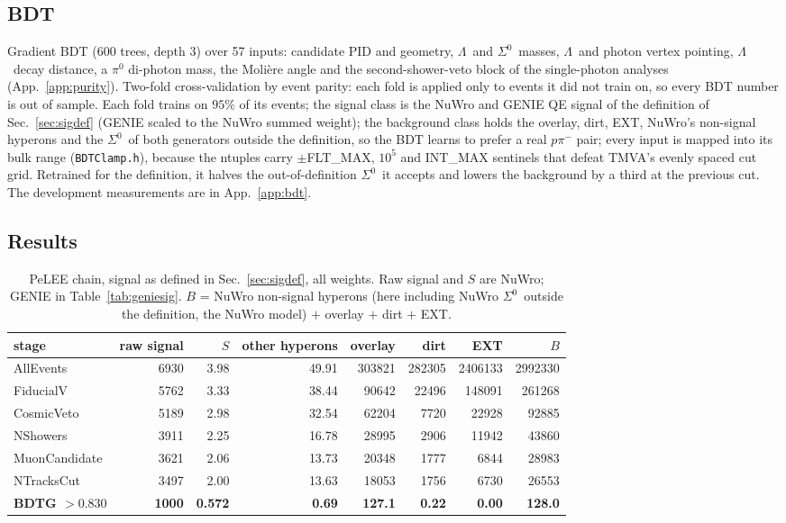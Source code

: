 \documentclass[11pt,a4paper]{article}
\newcommand{\Szero}{\ensuremath{\Sigma^{0}}}
\newcommand{\Lam}{\ensuremath{\Lambda}}
\begin{document}
\subsection{BDT}
\label{sec:bdt}
Gradient BDT (600 trees, depth 3) over 57 inputs: candidate PID and geometry, \Lam\ and
\Szero\ masses, \Lam\ and photon vertex pointing, \Lam\ decay distance, a $\pi^0$
di-photon mass, the Moli\`ere angle and the second-shower-veto block of the single-photon
analyses (App.~\ref{app:purity}). Two-fold cross-validation by event parity: each fold
is applied only to events it did not train on, so every BDT number is out of sample.
Each fold trains on $95\%$ of its events; the signal class is the NuWro and GENIE QE
signal of the definition of Sec.~\ref{sec:sigdef} (GENIE scaled to the NuWro summed weight);
the background class holds the overlay, dirt, EXT, NuWro's non-signal hyperons and the
\Szero\ of both generators outside the definition, so the BDT learns to prefer a real $p\pi^-$
pair; every input is mapped into its bulk range (\texttt{BDTClamp.h}), because the ntuples
carry $\pm$FLT\_MAX, $10^5$ and INT\_MAX sentinels that defeat TMVA's evenly spaced cut grid.
Retrained for the definition, it halves the out-of-definition \Szero\ it accepts and lowers
the background by a third at the previous cut. The development measurements are in
App.~\ref{app:bdt}.

\subsection{Results}
\label{sec:peleeresults}

\begin{table}[h]\centering
\caption{PeLEE chain, signal as defined in Sec.~\ref{sec:sigdef}, all weights. Raw signal and
$S$ are NuWro; GENIE in Table~\ref{tab:geniesig}. $B$ = NuWro non-signal hyperons (here
including NuWro \Szero\ outside the definition, the NuWro model) $+$ overlay $+$ dirt $+$ EXT.}
\label{tab:perf}
\small
\begin{tabular}{lrrrrrrr}
\toprule
stage & raw signal & $S$ & other hyperons & overlay & dirt & EXT & $B$ \\
\midrule
AllEvents     & 6930 & 3.98 & 49.91 & 303821 & 282305 & 2406133 & 2992330 \\
FiducialV     & 5762 & 3.33 & 38.44 &  90642 &  22496 &  148091 &  261268 \\
CosmicVeto    & 5189 & 2.98 & 32.54 &  62204 &   7720 &   22928 &   92885 \\
NShowers      & 3911 & 2.25 & 16.78 &  28995 &   2906 &   11942 &   43860 \\
MuonCandidate & 3621 & 2.06 & 13.73 &  20348 &   1777 &    6844 &   28983 \\
NTracksCut    & 3497 & 2.00 & 13.63 &  18053 &   1756 &    6730 &   26553 \\
\textbf{BDTG $>0.830$} & \textbf{1000} & \textbf{0.572} & \textbf{0.69} & \textbf{127.1} & \textbf{0.22} & \textbf{0.00} & \textbf{128.0} \\
\bottomrule
\end{tabular}
\end{table}
\end{document}
